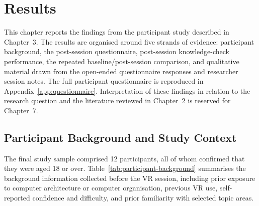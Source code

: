 \chapter{Results}

This chapter reports the findings from the participant study described in Chapter~3. The results are organised around five strands of evidence: participant background, the post-session questionnaire, post-session knowledge-check performance, the repeated baseline/post-session comparison, and qualitative material drawn from the open-ended questionnaire responses and researcher session notes. The full participant questionnaire is reproduced in Appendix~\ref{app:questionnaire}. Interpretation of these findings in relation to the research question and the literature reviewed in Chapter~2 is reserved for Chapter~7.

\section{Participant Background and Study Context}

The final study sample comprised 12 participants, all of whom confirmed that they were aged 18 or over. Table~\ref{tab:participant-background} summarises the background information collected before the VR session, including prior exposure to computer architecture or computer organisation, previous VR use, self-reported confidence and difficulty, and prior familiarity with selected topic areas.

